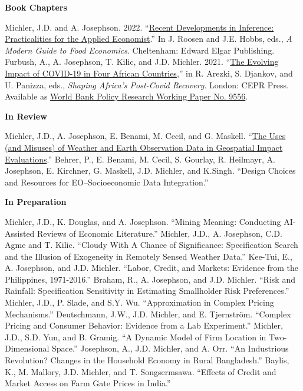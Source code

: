 \documentclass[letterpaper]{article}
\renewenvironment{itemize}{
  \begin{list}
  	{}{
    \setlength{\leftmargin}{1.5em}
    \setlength{\itemsep}{-.5em}
  }
}{
  \end{list}
}
\begin{document}
\begin{itemize}
\leftskip 0in
\item {\bf Book Chapters}

\leftskip 0.25in
\parindent -0.5in
\subitem Michler, J.D. and A. Josephson. 2022. ``\href{https://doi.org/10.4337/9781800372054.00019}{Recent Developments in Inference: Practicalities for the Applied Economist}.'' In J. Roosen and J.E. Hobbs, eds., \emph{A Modern Guide to Food Economics}. Cheltenham: Edward Elgar Publishing.
\subitem Furbush, A., A. Josephson, T. Kilic, and J.D. Michler. 2021. ``\href{https://voxeu.org/content/shaping-africa-s-post-covid-recovery}{The Evolving Impact of COVID-19 in Four African Countries},'' in R. Arezki, S. Djankov, and U. Panizza, eds., \emph{Shaping Africa’s Post-Covid Recovery}. London: CEPR Press. Available as \href{https://documents.worldbank.org/en/publication/documents-reports/documentdetail/810651614623398314/the-evolving-socioeconomic-impacts-of-covid-19-in-four-african-countries}{World Bank Policy Research Working Paper No. 9556}.  \\

\leftskip 0in
\item {\bf In Review}

\leftskip 0.25in
\parindent -0.5in
\subitem Michler, J.D., A. Josephson, E. Benami, M. Cecil, and G. Maskell. ``\href{http://arxiv.org/abs/2510.05108}{The Uses (and Misuses) of Weather and Earth Observation Data in Geospatial Impact Evaluations}.''
\subitem  Behrer, P., E. Benami,  M. Cecil, S. Gourlay, R. Heilmayr, A. Josephson, E. Kirchner, G. Maskell, J.D. Michler, and K.Singh. ``Design Choices and Resources for EO–Socioeconomic Data Integration.''  \\


\leftskip 0in
\item {\bf In Preparation}

\leftskip 0.25in
\parindent -0.5in

\subitem Michler, J.D., K. Douglas, and A. Josephson. ``Mining Meaning: Conducting AI-Assisted Reviews of Economic Literature.''
\subitem Michler, J.D., A. Josephson, C.D. Agme and T. Kilic. ``Cloudy With A Chance of Significance: Specification Search and the Illusion of Exogeneity in Remotely Sensed Weather Data.''
\subitem Kee-Tui, E., A. Josephson, and J.D. Michler. ``Labor, Credit, and Markets: Evidence from the Philippines, 1971-2016.''
\subitem Braham, R., A. Josephson, and J.D. Michler. ``Risk and Rainfall: Specification Sensitivity in Estimating Smallholder Risk Preferences.''
\subitem Michler, J.D., P. Slade, and S.Y. Wu. ``Approximation in Complex Pricing Mechanisms.''
\subitem Deutschmann, J.W., J.D. Michler, and E. Tjernstr\"{o}m. ``Complex Pricing and Consumer Behavior: Evidence from a Lab Experiment.''
\subitem Michler, J.D., S.D. Yun, and B. Gramig. ``A Dynamic Model of Firm Location in Two-Dimensional Space.''
\subitem Josephson, A., J.D. Michler, and A. Orr. ``An Industrious Revolution? Changes in the Household Economy in Rural Bangladesh.''
\subitem Baylis, K., M. Mallory, J.D. Michler, and T. Songsermsawa. ``Effects of Credit and Market Access on Farm Gate Prices in India.'' \\


\end{itemize}
\end{document}
